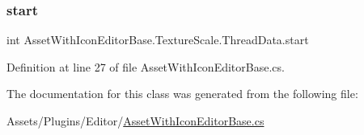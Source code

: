 \subsubsection{\texorpdfstring{start}{start}}
{\footnotesize\ttfamily int Asset\+With\+Icon\+Editor\+Base.\+Texture\+Scale.\+Thread\+Data.\+start}



Definition at line 27 of file Asset\+With\+Icon\+Editor\+Base.\+cs.



The documentation for this class was generated from the following file\+:\begin{DoxyCompactItemize}
\item 
Assets/\+Plugins/\+Editor/\mbox{\hyperlink{_asset_with_icon_editor_base_8cs}{Asset\+With\+Icon\+Editor\+Base.\+cs}}\end{DoxyCompactItemize}
